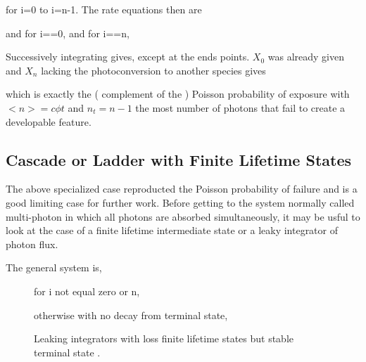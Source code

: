 for i=0 to i=n-1. The rate equations then are 



and for i==0,
and for i==n,

Successively integrating gives,
 except at the ends points. $X_0$ was already given and
$X_n$ lacking the photoconversion to another species gives




  
which is exactly the  ( complement of the  ) Poisson probability of exposure
 with $<n> = c\phi t $   and $n_t=n-1$
 the most number of photons that fail to create a developable feature. 


\subsection{ Cascade or Ladder with Finite Lifetime States  }

The above specialized case reproducted the Poisson probability of
failure and is a good limiting case for further work. 
Before getting to the system normally called multi-photon in which
all photons are absorbed simultaneously, it may be usful to look
at the case of a finite lifetime intermediate state or a leaky
integrator of photon flux. 

The general system is, 

\begin{figure}[htb]
\centering



for i not equal zero or n,



otherwise with no decay from terminal state,




\caption{ Leaking integrators with loss finite lifetime states but stable terminal state . }
\label{fig:leakyn} 
\end{figure}


